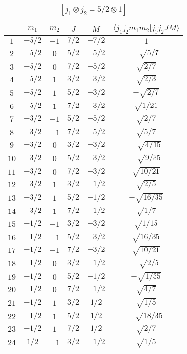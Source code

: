 \begin{table}
\tiny
\caption{$[j_1 \otimes j_2 = 5/2 \otimes 1]$}
\begin{center}
\begin{tabular}{|c|c|c|c|c|c|}
\hline 
   & $m_1$ & $m_2$ & $J$ & $M$ & $\langle j_1 j_2 m_1 m_2 | j_1 j_2 J M \rangle$ \\ 
\hline 
$1$ & $-5/2$ & $-1$ & $7/2$ & $-7/2$ & $1$ \\ 
$2$ & $-5/2$ & $0$ & $5/2$ & $-5/2$ & $-\sqrt{5/7}$ \\ 
$3$ & $-5/2$ & $0$ & $7/2$ & $-5/2$ & $\sqrt{2/7}$ \\ 
$4$ & $-5/2$ & $1$ & $3/2$ & $-3/2$ & $\sqrt{2/3}$ \\ 
$5$ & $-5/2$ & $1$ & $5/2$ & $-3/2$ & $-\sqrt{2/7}$ \\ 
$6$ & $-5/2$ & $1$ & $7/2$ & $-3/2$ & $\sqrt{1/21}$ \\ 
$7$ & $-3/2$ & $-1$ & $5/2$ & $-5/2$ & $\sqrt{2/7}$ \\ 
$8$ & $-3/2$ & $-1$ & $7/2$ & $-5/2$ & $\sqrt{5/7}$ \\ 
$9$ & $-3/2$ & $0$ & $3/2$ & $-3/2$ & $-\sqrt{4/15}$ \\ 
$10$ & $-3/2$ & $0$ & $5/2$ & $-3/2$ & $-\sqrt{9/35}$ \\ 
$11$ & $-3/2$ & $0$ & $7/2$ & $-3/2$ & $\sqrt{10/21}$ \\ 
$12$ & $-3/2$ & $1$ & $3/2$ & $-1/2$ & $\sqrt{2/5}$ \\ 
$13$ & $-3/2$ & $1$ & $5/2$ & $-1/2$ & $-\sqrt{16/35}$ \\ 
$14$ & $-3/2$ & $1$ & $7/2$ & $-1/2$ & $\sqrt{1/7}$ \\ 
$15$ & $-1/2$ & $-1$ & $3/2$ & $-3/2$ & $\sqrt{1/15}$ \\ 
$16$ & $-1/2$ & $-1$ & $5/2$ & $-3/2$ & $\sqrt{16/35}$ \\ 
$17$ & $-1/2$ & $-1$ & $7/2$ & $-3/2$ & $\sqrt{10/21}$ \\ 
$18$ & $-1/2$ & $0$ & $3/2$ & $-1/2$ & $-\sqrt{2/5}$ \\ 
$19$ & $-1/2$ & $0$ & $5/2$ & $-1/2$ & $-\sqrt{1/35}$ \\ 
$20$ & $-1/2$ & $0$ & $7/2$ & $-1/2$ & $\sqrt{4/7}$ \\ 
$21$ & $-1/2$ & $1$ & $3/2$ & $1/2$ & $\sqrt{1/5}$ \\ 
$22$ & $-1/2$ & $1$ & $5/2$ & $1/2$ & $-\sqrt{18/35}$ \\ 
$23$ & $-1/2$ & $1$ & $7/2$ & $1/2$ & $\sqrt{2/7}$ \\ 
$24$ & $1/2$ & $-1$ & $3/2$ & $-1/2$ & $\sqrt{1/5}$ \\ 

\end{tabular}
\end{center}
\end{table}
